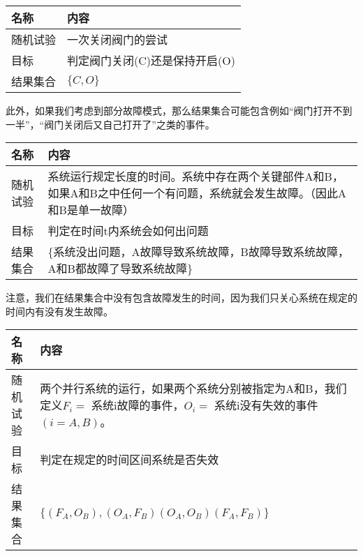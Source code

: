 \documentclass[cn,11pt,chinese]{elegantbook}
\begin{document}
\begin{table}[H]
	\centering
	\begin{tabular}{@{}ll@{}}
		\toprule
		名称   & 内容                                                                                                \\ \midrule
		随机试验 & 一次关闭阀门的尝试                                                                               \\
		目标   & 判定阀门关闭(C)还是保持开启(O)                                                                                      \\
		结果集合 & $\{C,O\}$ \\ \bottomrule
	\end{tabular}
\end{table}

此外，如果我们考虑到部分故障模式，那么结果集合可能包含例如“阀门打开不到一半”，“阀门关闭后又自己打开了”之类的事件。

\begin{table}[H]
	\centering
	\begin{tabular}{@{}lp{11cm}}
		\toprule
		名称   & 内容                                                                                                \\ \midrule
		随机试验 & 系统运行规定长度的时间。系统中存在两个关键部件A和B，如果A和B之中任何一个有问题，系统就会发生故障。（因此A和B是单一故障）  \\
		目标   & 判定在时间t内系统会如何出问题                                                                                      \\
		结果集合 & \{系统没出问题，A故障导致系统故障，B故障导致系统故障，A和B都故障了导致系统故障\} \\ \bottomrule
	\end{tabular}
\end{table}

注意，我们在结果集合中没有包含故障发生的时间，因为我们只关心系统在规定的时间内有没有发生故障。

\begin{table}[H]
	\centering
	\begin{tabular}{@{}lp{11cm}}
		\toprule
		名称   & 内容                                                                                                \\ \midrule
		随机试验 & 两个并行系统的运行，如果两个系统分别被指定为A和B，我们定义$F_i=$ 系统i故障的事件，$O_i=$ 系统i没有失效的事件$(i=A,B)$。  \\
		目标   & 判定在规定的时间区间系统是否失效                                                                                     \\
		结果集合 &$\{(F_A,O_B),(O_A,F_B)(O_A,O_B)(F_A,F_B)\}$\\ \bottomrule
	\end{tabular}
\end{table}
\end{document}
